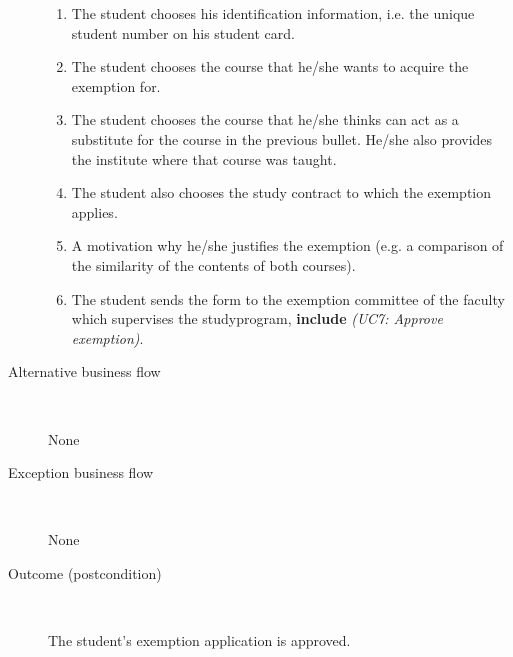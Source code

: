 \begin{description}
\begin{enumerate}
	  	\item The student chooses his identification information, i.e. the unique
	  	student number on his student card.
	  	\item The student chooses the course that he/she wants to acquire the
	  	exemption for. 
	  	\item The student chooses the course that he/she thinks can act as a
	  	substitute for the course in the previous bullet. He/she also provides the
	  	institute where that course was taught.
	  	\item The student also chooses the study contract to which the exemption
	  	applies.
	  	\item A motivation why he/she justifies the exemption (e.g. a comparison of
	  	the similarity of the contents of both courses).
	  	\item The student sends the form to the exemption committee of the faculty
	  	which supervises the studyprogram, \textbf{include} \emph{(UC7: Approve
	  	exemption)}.
	\end{enumerate}
	\item[Alternative business flow] \ 
		\par None
	\item[Exception business flow] \
		\par None
	\item[Outcome (postcondition)] \ 
		\par The student's exemption application is approved.
\end{description}